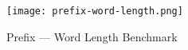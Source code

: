 \begin{figure}[H]
    \centering
    \texttt{[image: prefix-word-length.png]}
    \caption{Prefix --- Word Length Benchmark}\label{fig:prefix_word_length_bm}
\end{figure}